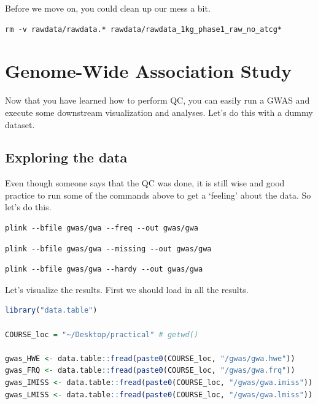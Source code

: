 \documentclass[
]{book}
\begin{document}
Before we move on, you could clean up our mess a bit.

\begin{lstlisting}
rm -v rawdata/rawdata.* rawdata/rawdata_1kg_phase1_raw_no_atcg*
\end{lstlisting}

\hypertarget{gwas-testing}{%
\chapter{Genome-Wide Association Study}\label{gwas-testing}}

Now that you have learned how to perform QC, you can easily run a GWAS and execute some downstream visualization and analyses. Let's do this with a dummy dataset.

\hypertarget{exploring-the-data}{%
\section{Exploring the data}\label{exploring-the-data}}

Even though someone says that the QC was done, it is still wise and good practice to run some of the commands above to get a `feeling' about the data. So let's do this.

\begin{lstlisting}
plink --bfile gwas/gwa --freq --out gwas/gwa
\end{lstlisting}

\begin{lstlisting}
plink --bfile gwas/gwa --missing --out gwas/gwa
\end{lstlisting}

\begin{lstlisting}
plink --bfile gwas/gwa --hardy --out gwas/gwa
\end{lstlisting}

Let's visualize the results. First we should load in all the results.

\begin{lstlisting}[language=R]
library("data.table")

COURSE_loc = "~/Desktop/practical" # getwd()

gwas_HWE <- data.table::fread(paste0(COURSE_loc, "/gwas/gwa.hwe"))
gwas_FRQ <- data.table::fread(paste0(COURSE_loc, "/gwas/gwa.frq"))
gwas_IMISS <- data.table::fread(paste0(COURSE_loc, "/gwas/gwa.imiss"))
gwas_LMISS <- data.table::fread(paste0(COURSE_loc, "/gwas/gwa.lmiss"))
\end{lstlisting}
\end{document}
